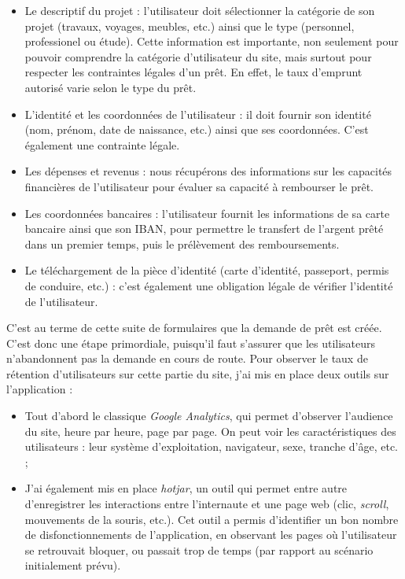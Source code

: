 \begin{itemize}
\tightlist
\item
  Le descriptif du projet : l'utilisateur doit sélectionner la catégorie
  de son projet (travaux, voyages, meubles, etc.) ainsi que le type
  (personnel, professionel ou étude). Cette information est importante,
  non seulement pour pouvoir comprendre la catégorie d'utilisateur du
  site, mais surtout pour respecter les contraintes légales d'un prêt.
  En effet, le taux d'emprunt autorisé varie selon le type du prêt.
\item
  L'identité et les coordonnées de l'utilisateur : il doit fournir son
  identité (nom, prénom, date de naissance, etc.) ainsi que ses
  coordonnées. C'est également une contrainte légale.
\item
  Les dépenses et revenus : nous récupérons des informations sur les
  capacités financières de l'utilisateur pour évaluer sa capacité à
  rembourser le prêt.
\item
  Les coordonnées bancaires : l'utilisateur fournit les informations de
  sa carte bancaire ainsi que son IBAN, pour permettre le transfert de
  l'argent prêté dans un premier temps, puis le prélèvement des
  remboursements.
\item
  Le téléchargement de la pièce d'identité (carte d'identité, passeport,
  permis de conduire, etc.) : c'est également une obligation légale de
  vérifier l'identité de l'utilisateur.
\end{itemize}

\bigskip

C'est au terme de cette suite de formulaires que la demande de prêt est
créée. C'est donc une étape primordiale, puisqu'il faut s'assurer que
les utilisateurs n'abandonnent pas la demande en cours de route. Pour
observer le taux de rétention d'utilisateurs sur cette partie du site,
j'ai mis en place deux outils sur l'application :

\begin{itemize}
\tightlist
\item
  Tout d'abord le classique \emph{Google Analytics}, qui permet
  d'observer l'audience du site, heure par heure, page par page. On peut
  voir les caractéristiques des utilisateurs : leur système
  d'exploitation, navigateur, sexe, tranche d'âge, etc. ;
\item
  J'ai également mis en place \emph{hotjar}, un outil qui permet entre
  autre d'enregistrer les interactions entre l'internaute et une page
  web (clic, \emph{scroll}, mouvements de la souris, etc.). Cet outil a
  permis d'identifier un bon nombre de disfonctionnements de
  l'application, en observant les pages où l'utilisateur se retrouvait
  bloquer, ou passait trop de temps (par rapport au scénario
  initialement prévu).
\end{itemize}

